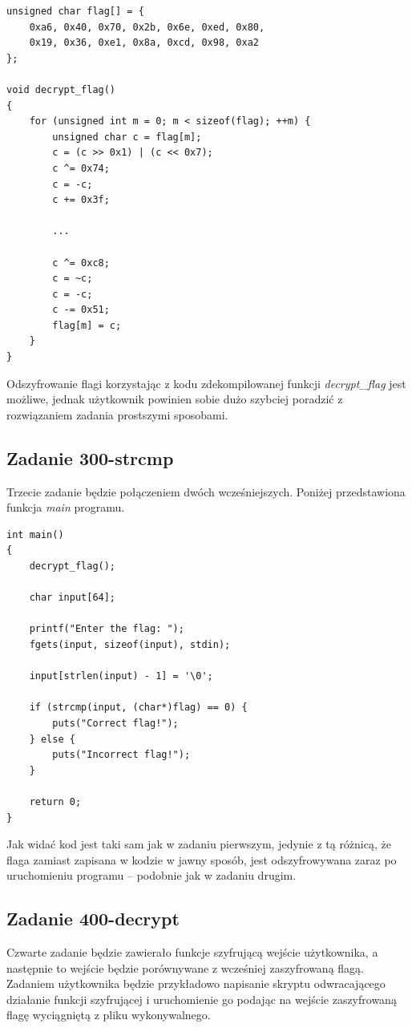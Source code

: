 \documentclass[polish,12pt]{aghthesis}
\begin{document}
\begin{verbatim}
unsigned char flag[] = {
    0xa6, 0x40, 0x70, 0x2b, 0x6e, 0xed, 0x80,
    0x19, 0x36, 0xe1, 0x8a, 0xcd, 0x98, 0xa2
};

void decrypt_flag()
{
    for (unsigned int m = 0; m < sizeof(flag); ++m) {
        unsigned char c = flag[m];
        c = (c >> 0x1) | (c << 0x7);
        c ^= 0x74;
        c = -c;
        c += 0x3f;

        ...

        c ^= 0xc8;
        c = ~c;
        c = -c;
        c -= 0x51;
        flag[m] = c;
    }
}
\end{verbatim}

Odszyfrowanie flagi korzystając z kodu zdekompilowanej funkcji \emph{decrypt\_flag} jest możliwe,
jednak użytkownik powinien sobie dużo szybciej poradzić z rozwiązaniem zadania prostszymi
sposobami.
\clearpage

\subsection{Zadanie 300-strcmp}

Trzecie zadanie będzie połączeniem dwóch wcześniejszych.
Poniżej przedstawiona funkcja \emph{main} programu.

\begin{verbatim}
int main()
{
    decrypt_flag();

    char input[64];

    printf("Enter the flag: ");
    fgets(input, sizeof(input), stdin);

    input[strlen(input) - 1] = '\0';

    if (strcmp(input, (char*)flag) == 0) {
        puts("Correct flag!");
    } else {
        puts("Incorrect flag!");
    }

    return 0;
}
\end{verbatim}

Jak widać kod jest taki sam jak w zadaniu pierwszym, jedynie z tą różnicą, że
flaga zamiast zapisana w kodzie w jawny sposób, jest odszyfrowywana zaraz po uruchomieniu
programu -- podobnie jak w zadaniu drugim.
\clearpage

\subsection{Zadanie 400-decrypt}

Czwarte zadanie będzie zawierało funkcje szyfrującą wejście użytkownika, a następnie to wejście będzie
porównywane z wcześniej zaszyfrowaną flagą. Zadaniem użytkownika będzie przykładowo napisanie skryptu
odwracającego działanie funkcji szyfrującej i uruchomienie go podając na wejście zaszyfrowaną flagę
wyciągniętą z pliku wykonywalnego.
\end{document}
